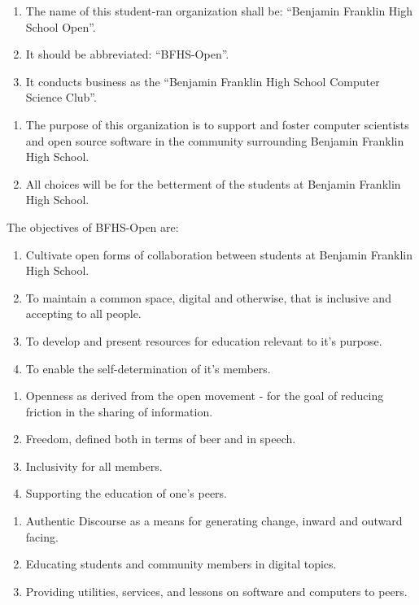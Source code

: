 
\begin{enumerate}
	\item The name of this student-ran organization shall be: “Benjamin Franklin
		High School Open”.

	\item It should be abbreviated: “BFHS-Open”.

	\item It conducts business as the “Benjamin Franklin High School Computer Science
		Club”.
\end{enumerate}

\begin{enumerate}
	\item The purpose of this organization is to support and foster computer scientists
		and open source software in the community surrounding Benjamin Franklin High
		School.

	\item All choices will be for the betterment of the students at Benjamin Franklin
		High School.
\end{enumerate}

 The objectives of BFHS-Open are:
\begin{enumerate}
	\item Cultivate open forms of collaboration between students at Benjamin Franklin
		High School.

	\item To maintain a common space, digital and otherwise, that is inclusive and
		accepting to all people.

	\item To develop and present resources for education relevant to it's purpose.

	\item To enable the self-determination of it's members.
\end{enumerate}

\begin{enumerate}
	\item Openness as derived from the open movement - for the goal of reducing friction
		in the sharing of information.

	\item Freedom, defined both in terms of beer and in speech.

	\item Inclusivity for all members.

	\item Supporting the education of one’s peers.
\end{enumerate}

\begin{enumerate}
	\item Authentic Discourse as a means for generating change, inward and outward
		facing.

	\item Educating students and community members in digital topics.

	\item Providing utilities, services, and lessons on software and computers to peers.
\end{enumerate}